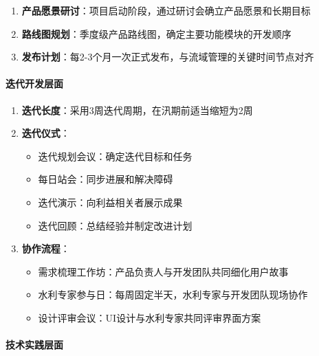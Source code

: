 \begin{enumerate}
\def\labelenumi{\arabic{enumi}.}
\tightlist
\item
  \textbf{产品愿景研讨}：项目启动阶段，通过研讨会确立产品愿景和长期目标
\item
  \textbf{路线图规划}：季度级产品路线图，确定主要功能模块的开发顺序
\item
  \textbf{发布计划}：每2-3个月一次正式发布，与流域管理的关键时间节点对齐
\end{enumerate}

\paragraph{迭代开发层面}\label{ux8fedux4ee3ux5f00ux53d1ux5c42ux9762}

\begin{enumerate}
\def\labelenumi{\arabic{enumi}.}
\tightlist
\item
  \textbf{迭代长度}：采用3周迭代周期，在汛期前适当缩短为2周
\item
  \textbf{迭代仪式}：

  \begin{itemize}
  \tightlist
  \item
    迭代规划会议：确定迭代目标和任务
  \item
    每日站会：同步进展和解决障碍
  \item
    迭代演示：向利益相关者展示成果
  \item
    迭代回顾：总结经验并制定改进计划
  \end{itemize}
\item
  \textbf{协作流程}：

  \begin{itemize}
  \tightlist
  \item
    需求梳理工作坊：产品负责人与开发团队共同细化用户故事
  \item
    水利专家参与日：每周固定半天，水利专家与开发团队现场协作
  \item
    设计评审会议：UI设计与水利专家共同评审界面方案
  \end{itemize}
\end{enumerate}

\paragraph{技术实践层面}\label{ux6280ux672fux5b9eux8df5ux5c42ux9762}


